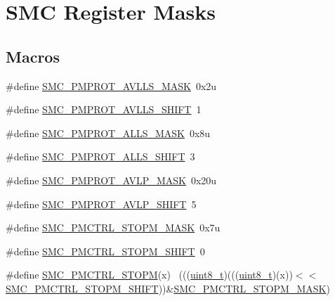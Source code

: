 \hypertarget{group___s_m_c___register___masks}{}\section{S\+MC Register Masks}
\label{group___s_m_c___register___masks}
\subsection*{Macros}
\begin{DoxyCompactItemize}
\item 
\#define \hyperlink{group___s_m_c___register___masks_ga62e9f3c7e74a3e5b80b0fae8a896640d}{S\+M\+C\+\_\+\+P\+M\+P\+R\+O\+T\+\_\+\+A\+V\+L\+L\+S\+\_\+\+M\+A\+SK}~0x2u
\item 
\#define \hyperlink{group___s_m_c___register___masks_gad625b387a627eb3a69f3a26edc0096b8}{S\+M\+C\+\_\+\+P\+M\+P\+R\+O\+T\+\_\+\+A\+V\+L\+L\+S\+\_\+\+S\+H\+I\+FT}~1
\item 
\#define \hyperlink{group___s_m_c___register___masks_ga79d87e312be895d4f2bdfdda8c947600}{S\+M\+C\+\_\+\+P\+M\+P\+R\+O\+T\+\_\+\+A\+L\+L\+S\+\_\+\+M\+A\+SK}~0x8u
\item 
\#define \hyperlink{group___s_m_c___register___masks_gac6cb1305b9cb329a8bb903036893db11}{S\+M\+C\+\_\+\+P\+M\+P\+R\+O\+T\+\_\+\+A\+L\+L\+S\+\_\+\+S\+H\+I\+FT}~3
\item 
\#define \hyperlink{group___s_m_c___register___masks_ga30602dafb393b5d9c52f0c75e1d78210}{S\+M\+C\+\_\+\+P\+M\+P\+R\+O\+T\+\_\+\+A\+V\+L\+P\+\_\+\+M\+A\+SK}~0x20u
\item 
\#define \hyperlink{group___s_m_c___register___masks_gae13777e671c1caf2d10809999574fed4}{S\+M\+C\+\_\+\+P\+M\+P\+R\+O\+T\+\_\+\+A\+V\+L\+P\+\_\+\+S\+H\+I\+FT}~5
\item 
\#define \hyperlink{group___s_m_c___register___masks_ga8df79d8a16a6d12e3b343eec59d9453c}{S\+M\+C\+\_\+\+P\+M\+C\+T\+R\+L\+\_\+\+S\+T\+O\+P\+M\+\_\+\+M\+A\+SK}~0x7u
\item 
\#define \hyperlink{group___s_m_c___register___masks_gaac7423086f31a8fbbfc8d18b1a876f26}{S\+M\+C\+\_\+\+P\+M\+C\+T\+R\+L\+\_\+\+S\+T\+O\+P\+M\+\_\+\+S\+H\+I\+FT}~0
\item 
\#define \hyperlink{group___s_m_c___register___masks_gac786585532e3edd7f48def55c208ef12}{S\+M\+C\+\_\+\+P\+M\+C\+T\+R\+L\+\_\+\+S\+T\+O\+PM}(x)                                        ~(((\hyperlink{_p_e___types_8h_aba7bc1797add20fe3efdf37ced1182c5}{uint8\+\_\+t})(((\hyperlink{_p_e___types_8h_aba7bc1797add20fe3efdf37ced1182c5}{uint8\+\_\+t})(x))$<$$<$\hyperlink{group___s_m_c___register___masks_gaac7423086f31a8fbbfc8d18b1a876f26}{S\+M\+C\+\_\+\+P\+M\+C\+T\+R\+L\+\_\+\+S\+T\+O\+P\+M\+\_\+\+S\+H\+I\+FT}))\&\hyperlink{group___s_m_c___register___masks_ga8df79d8a16a6d12e3b343eec59d9453c}{S\+M\+C\+\_\+\+P\+M\+C\+T\+R\+L\+\_\+\+S\+T\+O\+P\+M\+\_\+\+M\+A\+SK})
$$
\end{DoxyCompactItemize}
